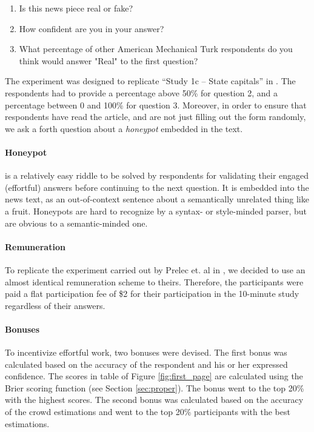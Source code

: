 \documentclass{report}
\theoremstyle{definition}
\begin{document}
\begin{enumerate}
    \item Is this news piece real or fake?
    \item How confident are you in your answer?
    \item What percentage of other American Mechanical Turk respondents do you think would answer "Real" to the first question?
\end{enumerate}

The experiment was designed to replicate ``Study 1c -- State capitals'' in \cite{prelec:nature}. The respondents had to provide a percentage above 50\% for question 2, and a percentage between 0 and 100\% for question 3. Moreover, in order to ensure that respondents have read the article, and are not just filling out the form randomly, we ask a forth question about a \emph{honeypot} embedded in the text.

\paragraph{Honeypot} is a relatively easy riddle to be solved by respondents for validating their engaged (effortful) answers before continuing to the next question. It is embedded into the news text, as an out-of-context sentence about a semantically unrelated thing like a fruit. Honeypots are hard to recognize by a syntax- or style-minded parser, but are obvious to a semantic-minded one.

\paragraph{Remuneration} To replicate the experiment carried out by Prelec et. al in \cite{prelec:nature}, we decided to use an almost identical remuneration scheme to theirs. Therefore, the participants were paid a flat participation fee of \$2 for their participation in the 10-minute study regardless of their answers. 

\paragraph{Bonuses} To incentivize effortful work, two  bonuses were devised. The first bonus was calculated based on the accuracy of the respondent and his or her expressed confidence. The scores in table of Figure \ref{fig:first_page} are calculated using the Brier scoring function (see Section \ref{sec:proper}). The bonus went to the top 20\% with the highest scores. The second bonus was calculated based on the accuracy of the crowd estimations and went to the top 20\% participants with the best estimations.
\end{document}
